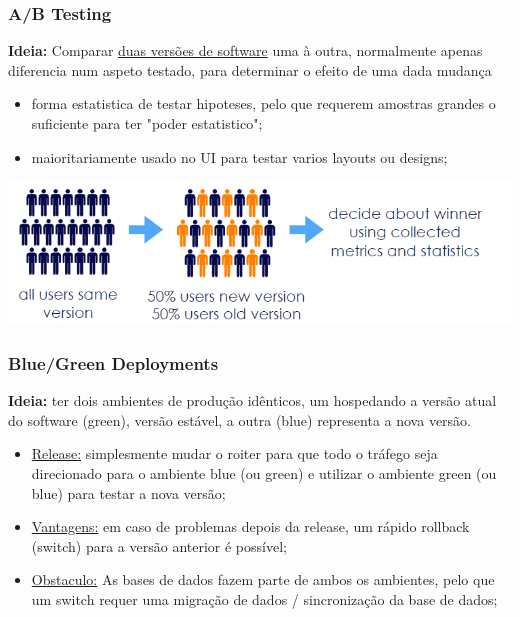 \documentclass{article}
\begin{document}
\subsubsection{A/B Testing}

\begin{flushleft}
  \textbf{Ideia:} Comparar \uline{duas versões de software}
  uma à outra, normalmente apenas diferencia num aspeto
  testado, para determinar o efeito de uma dada mudança
  \begin{itemize}
    \item forma estatistica de testar hipoteses, pelo que
    requerem amostras grandes o suficiente para ter "poder estatistico";
    \item maioritariamente usado no UI para testar varios layouts ou
    designs;
  \end{itemize}
\end{flushleft}

\begin{center}
  \includegraphics[scale=0.45]{43}
\end{center}

\subsubsection{Blue/Green Deployments}

\begin{flushleft}
  \textbf{Ideia:} ter dois ambientes de produção idênticos,
  um hospedando a versão atual do software (green), versão estável,
  a outra (blue) representa a nova versão.

  \begin{itemize}
    \item \uline{Release:} simplesmente mudar o roiter para que todo o tráfego
    seja direcionado para o ambiente blue (ou green) e utilizar o
    ambiente green (ou blue) para testar a nova versão;
    \item \uline{Vantagens:} em caso de problemas depois da release,
    um rápido rollback (switch) para a versão anterior é possível;
    \item \uline{Obstaculo:} As bases de dados fazem parte de ambos
    os ambientes, pelo que um switch requer uma migração de dados
    / sincronização da base de dados;
  \end{itemize}
\end{flushleft}
\end{document}
